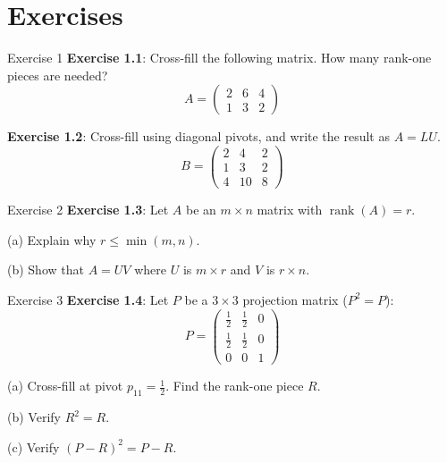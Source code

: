\documentclass[10pt]{beamer}
\theoremstyle{definition}
\begin{document}
\section{Exercises}

\begin{frame}{Exercise 1}
\textbf{Exercise 1.1}: Cross-fill the following matrix. How many rank-one pieces are needed?
$$A = \begin{pmatrix}
2 & 6 & 4 \\
1 & 3 & 2
\end{pmatrix}$$

\vfill

\textbf{Exercise 1.2}: Cross-fill using diagonal pivots, and write the result as $A = LU$.
$$B = \begin{pmatrix}
2 & 4 & 2 \\
1 & 3 & 2 \\
4 & 10 & 8
\end{pmatrix}$$
\end{frame}

\begin{frame}{Exercise 2}
\textbf{Exercise 1.3}: Let $A$ be an $m \times n$ matrix with $\operatorname{rank}(A) = r$.

\vfill

(a) Explain why $r \leq \min(m, n)$.

\vfill

(b) Show that $A = UV$ where $U$ is $m \times r$ and $V$ is $r \times n$.
\end{frame}

\begin{frame}{Exercise 3}
\textbf{Exercise 1.4}: Let $P$ be a $3\times 3$ projection matrix ($P^2 = P$):
$$P = \begin{pmatrix}
\frac{1}{2} & \frac{1}{2} & 0 \\[3pt]
\frac{1}{2} & \frac{1}{2} & 0 \\[3pt]
0 & 0 & 1
\end{pmatrix}$$

\vfill

(a) Cross-fill at pivot $p_{11} = \frac{1}{2}$. Find the rank-one piece $R$.

\vfill

(b) Verify $R^2 = R$.

\vfill

(c) Verify $(P-R)^2 = P - R$.
\end{frame}
\end{document}

